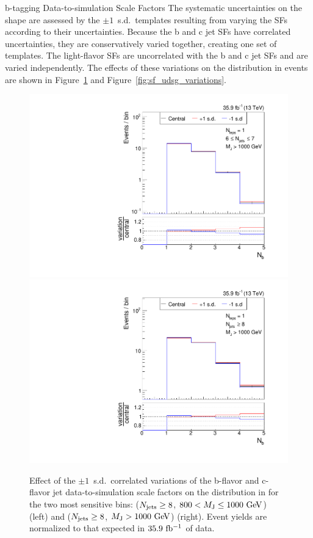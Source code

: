 \begin{section}{b-tagging Data-to-simulation Scale Factors}
The systematic uncertainties on the \Nb shape are assessed by the $\pm 1$~s.d.\ \Nb templates resulting from varying the SFs according to their uncertainties.
Because the b and c jet SFs have correlated uncertainties, they are conservatively varied together, creating one set of templates.
The light-flavor SFs are uncorrelated with the b and c jet SFs and are varied independently.
The effects of these variations on the \Nb distribution in \ttbar events are shown in Figure~\ref{fig:sf_bc_variations} and Figure~\ref{fig:sf_udsg_variations}.

\begin{figure}[tbp!]
\begin{center}
\includegraphics[angle=0,width=0.45\columnwidth]{fig/bin20_ttbar_btag_bc_mconly.pdf}
\includegraphics[angle=0,width=0.45\columnwidth]{fig/bin21_ttbar_btag_bc_mconly.pdf}
\end{center}
\caption{Effect of the $\pm 1$~s.d.\ correlated variations of the b-flavor and c-flavor jet data-to-simulation scale factors on the \Nb distribution in \ttbar for the two most sensitive bins: ($N_{\mathrm{jets}} \geq 8$, $800 < M_{\mathrm{J}} \leq 1000~\mathrm{Ge\kern -0.1em V}$) (left) and ($N_{\mathrm{jets}} \geq 8$, $M_{\mathrm{J}} > 1000~\mathrm{Ge\kern -0.1em V}$) (right).
Event yields are normalized to that expected in $35.9~\mathrm{fb^{-1}}$ of data.}
\label{fig:sf_bc_variations}
\end{figure}


\end{section}
